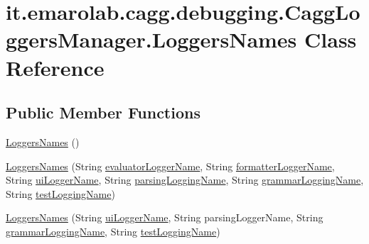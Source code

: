 \hypertarget{classit_1_1emarolab_1_1cagg_1_1debugging_1_1CaggLoggersManager_1_1LoggersNames}{\section{it.\-emarolab.\-cagg.\-debugging.\-Cagg\-Loggers\-Manager.\-Loggers\-Names Class Reference}
\label{classit_1_1emarolab_1_1cagg_1_1debugging_1_1CaggLoggersManager_1_1LoggersNames}
}
\subsection*{Public Member Functions}
\begin{DoxyCompactItemize}
\item 
\hyperlink{classit_1_1emarolab_1_1cagg_1_1debugging_1_1CaggLoggersManager_1_1LoggersNames_a929dc2411ac4303d9c6aa1e6340ea476}{Loggers\-Names} ()
\item 
\hyperlink{classit_1_1emarolab_1_1cagg_1_1debugging_1_1CaggLoggersManager_1_1LoggersNames_a3ff250eabb858cf32bd85552681d0106}{Loggers\-Names} (String \hyperlink{classit_1_1emarolab_1_1cagg_1_1debugging_1_1CaggLoggersManager_1_1LoggersNames_a62aeb947a6157484d55639478f8e2826}{evaluator\-Logger\-Name}, String \hyperlink{classit_1_1emarolab_1_1cagg_1_1debugging_1_1CaggLoggersManager_1_1LoggersNames_a3512e367d55c5c6fc6f1f2fabae2a7c0}{formatter\-Logger\-Name}, String \hyperlink{classit_1_1emarolab_1_1cagg_1_1debugging_1_1CaggLoggersManager_1_1LoggersNames_aaccd04f4d8934067e7d10f9fa578300f}{ui\-Logger\-Name}, String \hyperlink{classit_1_1emarolab_1_1cagg_1_1debugging_1_1CaggLoggersManager_1_1LoggersNames_a695bbbe86f0c7e0010102f9fac57e12e}{parsing\-Logging\-Name}, String \hyperlink{classit_1_1emarolab_1_1cagg_1_1debugging_1_1CaggLoggersManager_1_1LoggersNames_a789725ee9f7c0046f86227f0ddff92b3}{grammar\-Logging\-Name}, String \hyperlink{classit_1_1emarolab_1_1cagg_1_1debugging_1_1CaggLoggersManager_1_1LoggersNames_a860f6b69ae378023ab41426c525ad092}{test\-Logging\-Name})
\item 
\hyperlink{classit_1_1emarolab_1_1cagg_1_1debugging_1_1CaggLoggersManager_1_1LoggersNames_a19c8f84bea94bfdf3d575624f53bc494}{Loggers\-Names} (String \hyperlink{classit_1_1emarolab_1_1cagg_1_1debugging_1_1CaggLoggersManager_1_1LoggersNames_aaccd04f4d8934067e7d10f9fa578300f}{ui\-Logger\-Name}, String parsing\-Logger\-Name, String \hyperlink{classit_1_1emarolab_1_1cagg_1_1debugging_1_1CaggLoggersManager_1_1LoggersNames_a789725ee9f7c0046f86227f0ddff92b3}{grammar\-Logging\-Name}, String \hyperlink{classit_1_1emarolab_1_1cagg_1_1debugging_1_1CaggLoggersManager_1_1LoggersNames_a860f6b69ae378023ab41426c525ad092}{test\-Logging\-Name})

\end{DoxyCompactItemize}
